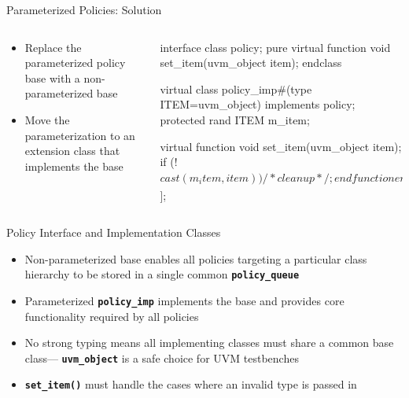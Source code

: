 \documentclass[aspectratio=169]{beamer}
\newcommand{\code}[1]{
  \textbf{\texttt{#1}}
}
\begin{document}
\begin{frame}[fragile]{Parameterized Policies: Solution}
\begin{columns}
\begin{column}{0.3\textwidth}
\begin{itemize}
  \item Replace the parameterized policy base with a non-parameterized base
  \item Move the parameterization to an extension class that implements the base
\end{itemize}
\end{column}
\begin{column}{0.6\textwidth}
\scriptsize
\begin{svcode}
interface class policy;
  pure virtual function void set_item(uvm_object item);
endclass

virtual class policy_imp#(type ITEM=uvm_object) implements policy;
  protected rand ITEM m_item;

  virtual function void set_item(uvm_object item);
    if (!$cast(m_item, item)) /* cleanup */;
  endfunction
endclass

typedef policy policy_queue[$];
\end{svcode}
\end{column}
\end{columns}
\end{frame}

\begin{frame}{Policy Interface and Implementation Classes}
\begin{itemize}
  \item Non-parameterized base enables all policies targeting a particular class hierarchy to be stored in a single common \code{policy_queue}
  \item Parameterized \code{policy_imp} implements the base and provides core functionality required by all policies
  \item No strong typing means all implementing classes must share a common base class---\code{uvm_object} is a safe choice for UVM testbenches
  \item \code{set_item()} must handle the cases where an invalid type is passed in
\end{itemize}
\end{frame}
\end{document}

